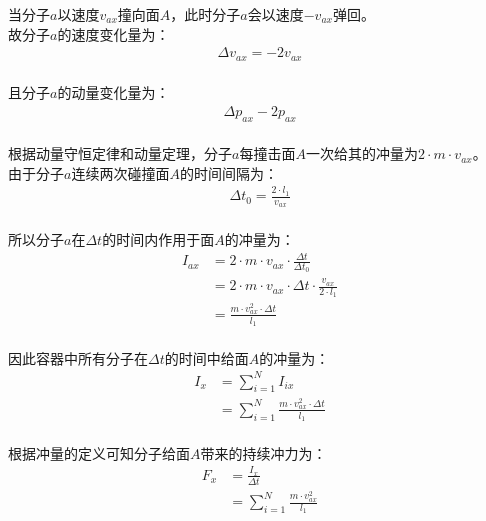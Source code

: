 \documentclass[UTF8]{ctexart}
\begin{document}
\newpage

    当分子$a$以速度$v_{ax}$撞向面$A$，此时分子$a$会以速度$-v_{ax}$弹回。\\[3mm]
    故分子$a$的速度变化量为：
    \begin{align}
        \Delta v_{ax}=-2v_{ax}
    \end{align}\\
    且分子$a$的动量变化量为：
    \begin{align}
        \Delta p_{ax}-2p_{ax}
    \end{align}\\
    根据动量守恒定律和动量定理，分子$a$每撞击面$A$一次给其的冲量为$2\cdot m\cdot v_{ax}$。\\[6mm]
    由于分子$a$连续两次碰撞面$A$的时间间隔为：
    \begin{align}
        \Delta t_0=\frac{2\cdot l_1}{v_{ax}}
    \end{align}\\
    所以分子$a$在$\Delta t$的时间内作用于面$A$的冲量为：\vspace{5pt}
    \begin{align}
        I_{ax}
        &=2\cdot m\cdot v_{ax}\cdot\frac{\Delta t}{\Delta t_0}\\[3mm]
        &=2\cdot m\cdot v_{ax}\cdot\Delta t\cdot\frac{v_{ax}}{2\cdot l_1}\\[3mm]
        &=\frac{m\cdot v_{ax}^2\cdot\Delta t}{l_1}
    \end{align}\\
    因此容器中所有分子在$\Delta t$的时间中给面$A$的冲量为：\vspace{5pt}
    \begin{align}
        I_x
        &=\sum_{i=1}^{N}I_{ix}\\[3mm]
        &=\sum_{i=1}^{N}\frac{m\cdot v_{ax}^2\cdot\Delta t}{l_1}
    \end{align}\\
    根据冲量的定义可知分子给面$A$带来的持续冲力为：\vspace{5pt}
    \begin{align}
        F_x
        &=\frac{I_x}{\Delta t}\\[3mm]
        &=\sum_{i=1}^{N}\frac{m\cdot v_{ax}^2}{l_1}
    \end{align}\\

\newpage
\end{document}
